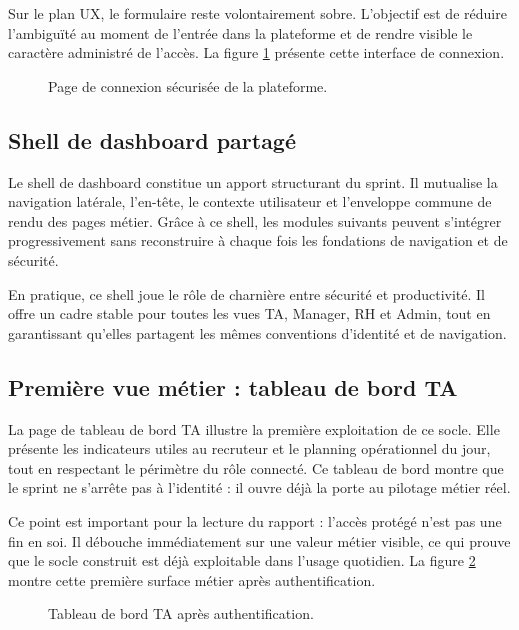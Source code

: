 Sur le plan UX, le formulaire reste volontairement sobre. L'objectif est de réduire l'ambiguïté au moment de l'entrée dans la plateforme et de rendre visible le caractère administré de l'accès. La figure \ref{fig:sign-in-page} présente cette interface de connexion.

\begin{figure}[H]
  \centering
  \caption{\label{fig:sign-in-page}Page de connexion sécurisée de la plateforme.}
\end{figure}

\subsection{Shell de dashboard partagé}
Le shell de dashboard constitue un apport structurant du sprint. Il mutualise la navigation latérale, l'en-tête, le contexte utilisateur et l'enveloppe commune de rendu des pages métier. Grâce à ce shell, les modules suivants peuvent s'intégrer progressivement sans reconstruire à chaque fois les fondations de navigation et de sécurité.

En pratique, ce shell joue le rôle de charnière entre sécurité et productivité. Il offre un cadre stable pour toutes les vues TA, Manager, RH et Admin, tout en garantissant qu'elles partagent les mêmes conventions d'identité et de navigation.

\subsection{Première vue métier : tableau de bord TA}
La page de tableau de bord TA illustre la première exploitation de ce socle. Elle présente les indicateurs utiles au recruteur et le planning opérationnel du jour, tout en respectant le périmètre du rôle connecté. Ce tableau de bord montre que le sprint ne s'arrête pas à l'identité : il ouvre déjà la porte au pilotage métier réel.

Ce point est important pour la lecture du rapport : l'accès protégé n'est pas une fin en soi. Il débouche immédiatement sur une valeur métier visible, ce qui prouve que le socle construit est déjà exploitable dans l'usage quotidien.
La figure \ref{fig:ta-dashboard} montre cette première surface métier après authentification.

\begin{figure}[H]
  \centering
  \caption{\label{fig:ta-dashboard}Tableau de bord TA après authentification.}
\end{figure}

